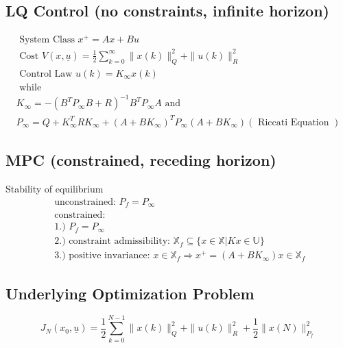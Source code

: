 \documentclass[english]{latex4ei/latex4ei_sheet}
\begin{document}
\begin{sectionbox}
\subsection{LQ Control (no constraints, infinite horizon)}
$$
\begin{array}{l}{\text { System Class } x^{+}=A x+B u} \\ {\text { Cost } V(x, \underline{u})=\frac{1}{2} \sum_{k=0}^{\infty}\|x(k)\|_{Q}^{2}+\|u(k)\|_{R}^{2}} \\ {\text { Control Law } u(k)=K_{\infty} x(k)} \\ {\text { while }} \\ {K_{\infty}=-\left(B^{T} P_{\infty} B+R\right)^{-1} B^{T} P_{\infty} A \text { and }} \\ {P_{\infty}=Q+K_{\infty}^{T} R K_{\infty}+\left(A+B K_{\infty}\right)^{T} P_{\infty}\left(A+B K_{\infty}\right)(\text { Riccati Equation })}\end{array}
$$

\subsection{MPC (constrained, receding horizon)}
Stability of equilibrium
$$
\begin{array}{l}{\text { unconstrained: } P_{f}=P_{\infty}} \\ {\text { constrained: }} \\ {\text { 1.) } P_{f}=P_{\infty}} \\ {\text { 2.) constraint admissibility: } \mathbb{X}_{f} \subseteq\{x \in \mathbb{X} | K x \in \mathbb{U}\}} \\ {\text { 3.) positive invariance: } x \in \mathbb{X}_{f} \Rightarrow x^{+}=\left(A+B K_{\infty}\right) x \in \mathbb{X}_{f}}\end{array}
$$

\subsection{Underlying Optimization Problem}
$$
J_{N}\left(x_{0}, \underline{u}\right)=\frac{1}{2} \sum_{k=0}^{N-1}\|x(k)\|_{Q}^{2}+\|u(k)\|_{R}^{2}+\frac{1}{2}\|x(N)\|_{P_{f}}^{2}
$$

\end{sectionbox}

\newpage
\end{document}
